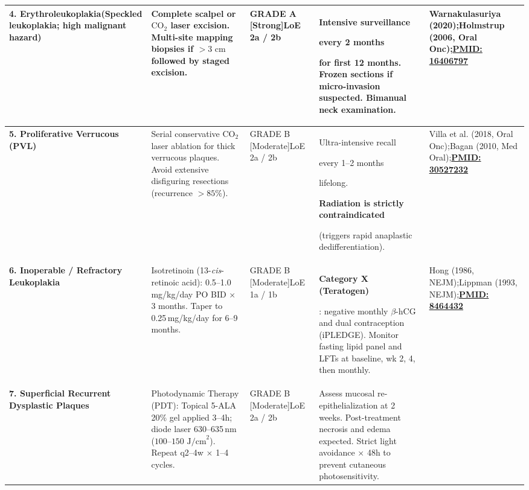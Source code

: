 \documentclass[9pt,a4paper]{article}
\newcommand{\hlg}[1]{\colorbox{hlgray}{\strut #1}}
\newcommand{\hlr}[1]{\colorbox{hlred}{\strut\color{darkred}#1}}
\begin{document}
\begin{tabularx}{\linewidth}{>{\raggedright\arraybackslash}p{2.8cm} >{\raggedright\arraybackslash}p{3.8cm} >{\raggedright\arraybackslash}p{2.0cm} >{\raggedright\arraybackslash}p{5.1cm} >{\raggedright\arraybackslash}X}
\midrule
\textbf{4. Erythroleukoplakia}\newline\scriptsize (Speckled leukoplakia; high malignant hazard) &
Complete scalpel or $\text{CO}_2$ laser excision. Multi-site mapping biopsies if $>3\text{ cm}$ followed by staged excision. &
GRADE A [Strong]\newline LoE 2a / 2b &
Intensive surveillance \hlg{every 2 months} for first 12 months. Frozen sections if micro-invasion suspected. Bimanual neck examination. &
Warnakulasuriya (2020);\newline Holmstrup (2006, Oral Onc);\newline \href{https://pubmed.ncbi.nlm.nih.gov/16406797/}{\textbf{PMID: 16406797}} \\
\midrule
\textbf{5. Proliferative Verrucous (PVL)} &
Serial conservative $\text{CO}_2$ laser ablation for thick verrucous plaques. Avoid extensive disfiguring resections (recurrence $>85\%$). &
GRADE B [Moderate]\newline LoE 2a / 2b &
Ultra-intensive recall \hlr{every 1--2 months} lifelong. \hlr{\textbf{Radiation is strictly contraindicated}} (triggers rapid anaplastic dedifferentiation). &
Villa et al. (2018, Oral Onc);\newline Bagan (2010, Med Oral);\newline \href{https://pubmed.ncbi.nlm.nih.gov/30527232/}{\textbf{PMID: 30527232}} \\
\midrule
\textbf{6. Inoperable / Refractory Leukoplakia} &
Isotretinoin (13-\textit{cis}-retinoic acid): 0.5--1.0\,mg/kg/day PO BID $\times$ 3 months. Taper to 0.25\,mg/kg/day for 6--9 months. &
GRADE B [Moderate]\newline LoE 1a / 1b &
\hlr{\textbf{Category X (Teratogen)}}: negative monthly $\beta$-hCG and dual contraception (iPLEDGE). Monitor fasting lipid panel and LFTs at baseline, wk 2, 4, then monthly. &
Hong (1986, NEJM);\newline Lippman (1993, NEJM);\newline \href{https://pubmed.ncbi.nlm.nih.gov/8464432/}{\textbf{PMID: 8464432}} \\
\midrule
\textbf{7. Superficial Recurrent Dysplastic Plaques} &
Photodynamic Therapy (PDT): Topical 5-ALA 20\% gel applied 3--4h; diode laser 630--635\,nm ($100\text{--}150\text{ J/cm}^2$). Repeat q2--4w $\times$ 1--4 cycles. &
GRADE B [Moderate]\newline LoE 2a / 2b &
Assess mucosal re-epithelialization at 2 weeks. Post-treatment necrosis and edema expected. Strict light avoidance $\times$ 48h to prevent cutaneous photosensitivity. &

\end{tabularx}
\end{document}
